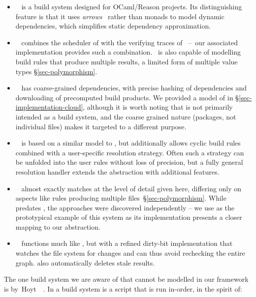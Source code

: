 \begin{itemize}
\item \Dune~\cite{dune} is a build system designed for OCaml/Reason projects.
Its distinguishing feature is that it uses
\emph{arrows}~\cite{hughes2000generalising} rather than monads to model
dynamic dependencies, which simplifies static dependency approximation.

\item \Ninja~\cite{ninja} combines the  scheduler of \Make with
the verifying traces of \Shake~--~our associated implementation provides such a
combination. \Ninja~is also capable of modelling build rules that produce
multiple results, a limited form of multiple value types \S\ref{sec-polymorphism}.

\item \Nix~\cite{dolstra2004nix} has coarse-grained dependencies, with precise
hashing of dependencies and downloading of precomputed build products. We
provided a model of \Nix in \S\ref{sec-implementation-cloud}, although it is
worth noting that \Nix is not primarily intended as a build system, and the
coarse grained nature (packages, not individual files) makes it targeted to a
different purpose.

\item \Pluto~\cite{erdweg2015pluto} is based on a similar model to \Shake, but
additionally allows cyclic build rules combined with a user-specific resolution
strategy. Often such a strategy can be unfolded into the user rules without loss
of precision, but a fully general resolution handler extends the 
abstraction with additional features.

\item \Redo~\cite{redo-idea,grosskurth2007redo,redo} almost exactly
matches \Shake at the level of detail given here, differing only on aspects like
rules producing multiple files~\S\ref{sec-polymorphism}. While \Redo predates \Shake,
the approaches were discovered independently -- we use \Shake as the prototypical
example of this system as its implementation presents a closer mapping to our
 abstraction.

\item \Tup~\cite{tup} functions much like \Make, but with a refined dirty-bit
implementation that watches the file system for changes and can thus avoid
rechecking the entire graph. \Tup also automatically deletes stale results.
\end{itemize}

The one build system we are aware of that cannot be modelled in our framework is
\Fabricate by~Hoyt~\etal~. In \Fabricate a build system is
a script that is run in-order, in the spirit of:

